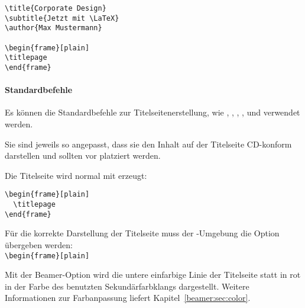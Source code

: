 \begin{minipage}{0.5\textwidth}
\begin{verbatim}
\title{Corporate Design}
\subtitle{Jetzt mit \LaTeX}
\author{Max Mustermann}

\begin{frame}[plain]
\titlepage
\end{frame}
\end{verbatim}
\end{minipage}%
\begin{minipage}{0.5\textwidth}
\end{minipage}

\paragraph{Standardbefehle}

Es können die Standardbefehle zur Titelseitenerstellung, wie
,
,
,
,
und  verwendet werden.

Sie sind jeweils so angepasst, dass sie den Inhalt auf der Titelseite CD-konform
darstellen und sollten vor \lstinline!! platziert werden.


Die Titelseite wird normal mit  erzeugt:

\begin{lstlisting}
\begin{frame}[plain]
  \titlepage
\end{frame}
\end{lstlisting}

\begin{important}
Für die korrekte Darstellung der Titelseite muss der -Umgebung
die Option  übergeben werden:\\
\lstinline!\begin{frame}[plain]!
\end{important}


\begin{Declaration}
\end{Declaration}

Mit der Beamer-Option  wird die untere einfarbige Linie
der Titelseite statt in rot in der Farbe des benutzten Sekundärfarbklangs
dargestellt. Weitere Informationen zur Farbanpassung liefert
Kapitel~\ref{beamer:sec:color}.


